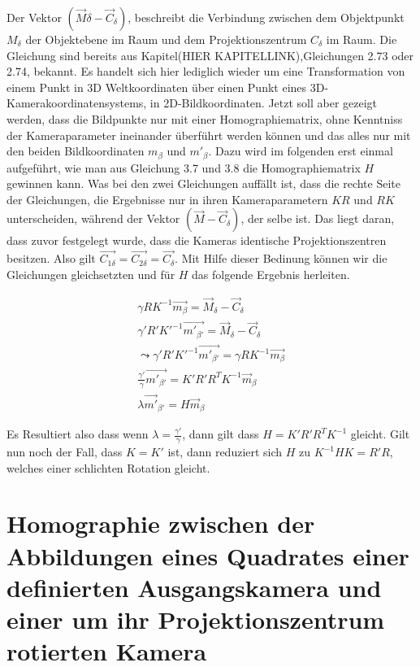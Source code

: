 Der Vektor $(\vec{M}\delta - \vec{C}_\delta)$, beschreibt die Verbindung zwischen dem Objektpunkt $M_\delta$ der Objektebene im Raum und dem Projektionszentrum $C_\delta$ im Raum. Die Gleichung sind bereits aus Kapitel(HIER KAPITELLINK),Gleichungen 2.73 oder 2.74, bekannt. Es handelt sich hier lediglich wieder um eine Transformation von einem Punkt in 3D Weltkoordinaten über einen Punkt eines 3D- Kamerakoordinatensystems, in 2D-Bildkoordinaten. Jetzt soll aber gezeigt werden, dass die Bildpunkte nur mit einer Homographiematrix, ohne Kenntniss der Kameraparameter ineinander überführt werden können und das alles nur mit den beiden Bildkoordinaten $m_\beta$ und $m'_{\beta}$. Dazu wird im folgenden erst einmal aufgeführt, wie man aus Gleichung 3.7 und 3.8 die Homographiematrix $H$ gewinnen kann. Was bei den zwei Gleichungen auffällt ist, dass die rechte Seite der Gleichungen, die Ergebnisse nur in ihren Kameraparametern $KR$ und $RK$ unterscheiden, während der Vektor $(\vec{M}-\vec{C}_\delta)$, der selbe ist. Das liegt daran, dass zuvor festgelegt wurde, dass die Kameras identische Projektionszentren besitzen. Also gilt $\vec{C_{1\delta}} = \vec{C_{2\delta}} = \vec{C_{\delta}}$. Mit Hilfe dieser Bedinung können wir die Gleichungen gleichsetzten und für $H$ das folgende Ergebnis herleiten. 


\begin{gather}
	\gamma RK^{-1}\vec{m_\beta} = \vec{M}_\delta - \vec{C}_\delta\\
	\gamma' R'K'^{-1}\vec{m'_{\beta'}} = \vec{M}_\delta - \vec{C}_\delta\\
	\leadsto \gamma' R'K'^{-1}\vec{m'_{\beta'}}=\gamma RK^{-1}\vec{m_\beta}\\
	\frac{\gamma'}{\gamma}\vec{m'_{\beta'}} = K'R'R^TK^{-1}\vec{m}_\beta\\
	\lambda \vec{m'}_{\beta'} = H\vec{m}_\beta
\end{gather}

Es Resultiert also dass wenn $\lambda = \frac{\gamma'}{\gamma}$, dann gilt dass $H = K'R'R^TK^{-1}$ gleicht. Gilt nun noch der Fall, dass $K = K'$ ist, dann reduziert sich $H$ zu $K^{-1}HK = R'R$, welches einer schlichten Rotation gleicht.\cite{Elements}




\section{Homographie zwischen der Abbildungen eines Quadrates einer definierten Ausgangskamera und einer um ihr Projektionszentrum rotierten Kamera}

